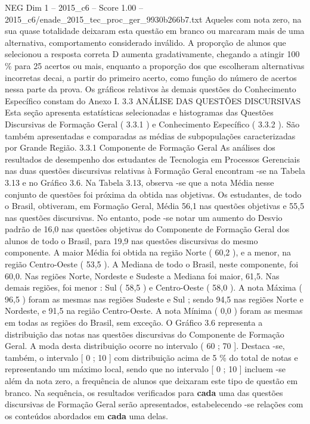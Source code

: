 \begin{textsample}{NEG Dim 1 – 2015\_c6 – Score 1.00 – 2015\_c6/enade\_2015\_tec\_proc\_ger\_9930b266b7.txt}
Aqueles com nota zero, na sua quase totalidade deixaram esta questão em branco ou marcaram mais de uma alternativa, comportamento considerado inválido.
A proporção de alunos que selecionou a resposta correta D aumenta gradativamente, chegando a atingir 100 \% para 25 acertos ou mais, enquanto a proporção dos que escolheram alternativas incorretas decai, a partir do primeiro acerto, como função do número de acertos nessa parte da prova.
Os gráficos relativos às demais questões do Conhecimento Específico constam do Anexo I. 3.3 ANÁLISE DAS QUESTÕES DISCURSIVAS Esta seção apresenta estatísticas selecionadas e histogramas das Questões Discursivas de Formação Geral ( 3.3.1 ) e Conhecimento Específico ( 3.3.2 ).
São também apresentadas e comparadas as médias de subpopulações caracterizadas por Grande Região. 3.3.1 Componente de Formação Geral As análises dos resultados de desempenho dos estudantes de Tecnologia em Processos Gerenciais nas duas questões discursivas relativas à Formação Geral encontram -se na Tabela 3.13 e no Gráfico 3.6.
Na Tabela 3.13, observa -se que a nota Média nesse conjunto de questões foi próxima da obtida nas objetivas.
Os estudantes, de todo o Brasil, obtiveram, em Formação Geral, Média 56,1 nas questões objetivas e 55,5 nas questões discursivas.
No entanto, pode -se notar um aumento do Desvio padrão de 16,0 nas questões objetivas do Componente de Formação Geral dos alunos de todo o Brasil, para 19,9 nas questões discursivas do mesmo componente.
A maior Média foi obtida na região Norte ( 60,2 ), e a menor, na região Centro-Oeste ( 53,5 ).
A Mediana de todo o Brasil, neste componente, foi 60,0.
Nas regiões Norte, Nordeste e Sudeste a Mediana foi maior, 61,5.
Nas demais regiões, foi menor : Sul ( 58,5 ) e Centro-Oeste ( 58,0 ).
A nota Máxima ( 96,5 ) foram as mesmas nas regiões Sudeste e Sul ; sendo 94,5 nas regiões Norte e Nordeste, e 91,5 na região Centro-Oeste.
A nota Mínima ( 0,0 ) foram as mesmas em todas as regiões do Brasil, sem exceção.
O Gráfico 3.6 representa a distribuição das notas nas questões discursivas do Componente de Formação Geral.
A moda desta distribuição ocorre no intervalo ( 60 ; 70 ].
Destaca -se, também, o intervalo [ 0 ; 10 ] com distribuição acima de 5 \% do total de notas e representando um máximo local, sendo que no intervalo [ 0 ; 10 ] incluem -se além da nota zero, a frequência de alunos que deixaram este tipo de questão em branco.
Na sequência, os resultados verificados para \textbf{cada} uma das questões discursivas de Formação Geral serão apresentados, estabelecendo -se relações com os conteúdos abordados em \textbf{cada} uma delas.

\end{textsample}
